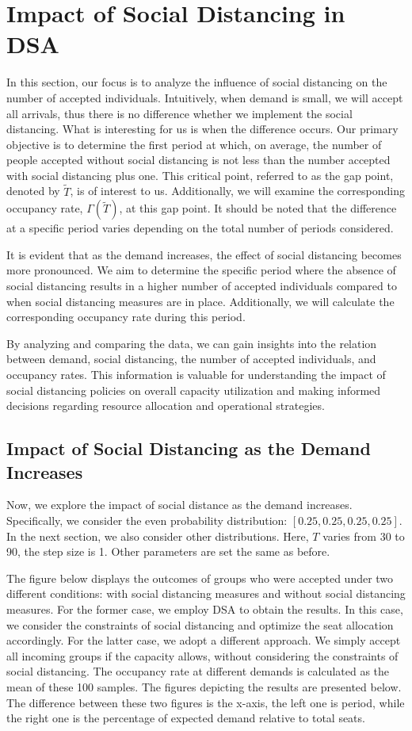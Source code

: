 \section{Impact of Social Distancing in DSA}
In this section, our focus is to analyze the influence of social distancing on the number of accepted individuals. Intuitively, when demand is small, we will accept all arrivals, thus there is no difference whether we implement the social distancing. What is interesting for us is when the difference occurs. Our primary objective is to determine the first period at which, on average, the number of people accepted without social distancing is not less than the number accepted with social distancing plus one. This critical point, referred to as the gap point, denoted by $\tilde{T}$, is of interest to us. Additionally, we will examine the corresponding occupancy rate, $\Gamma(\tilde{T})$, at this gap point. It should be noted that the difference at a specific period varies depending on the total number of periods considered.


It is evident that as the demand increases, the effect of social distancing becomes more pronounced. We aim to determine the specific period where the absence of social distancing results in a higher number of accepted individuals compared to when social distancing measures are in place. Additionally, we will calculate the corresponding occupancy rate during this period.

By analyzing and comparing the data, we can gain insights into the relation between demand, social distancing, the number of accepted individuals, and occupancy rates. This information is valuable for understanding the impact of social distancing policies on overall capacity utilization and making informed decisions regarding resource allocation and operational strategies.

\subsection{Impact of Social Distancing as the Demand Increases}
Now, we explore the impact of social distance as the demand increases. Specifically, we consider the even probability distribution: $[0.25, 0.25, 0.25, 0.25]$. In the next section, we also consider other 
distributions. Here, $T$ varies from 30 to 90, the step size is 1. Other parameters are set the same as before.

The figure below displays the outcomes of groups who were accepted under two different conditions: with social distancing measures and without social distancing measures. For the former case, we employ DSA to obtain the results. In this case, we consider the constraints of social distancing and optimize the seat allocation accordingly. For the latter case, we adopt a different approach. We simply accept all incoming groups if the capacity allows, without considering the constraints of social distancing. The occupancy rate at different demands is calculated as the mean of these 100 samples. The figures depicting the results are presented below. The difference between these two figures is the x-axis, the left one is period, while the right one is the percentage of expected demand relative to total seats.


